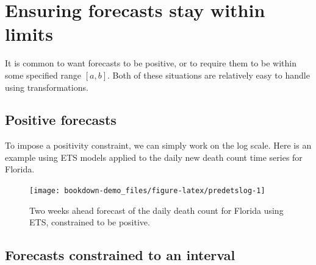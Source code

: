 \documentclass[]{book}
\newenvironment{Shaded}{\begin{snugshade}}{\end{snugshade}}
\newcommand{\KeywordTok}[1]{\textcolor[rgb]{0.13,0.29,0.53}{\textbf{#1}}}
\newcommand{\DataTypeTok}[1]{\textcolor[rgb]{0.13,0.29,0.53}{#1}}
\newcommand{\DecValTok}[1]{\textcolor[rgb]{0.00,0.00,0.81}{#1}}
\newcommand{\StringTok}[1]{\textcolor[rgb]{0.31,0.60,0.02}{#1}}
\newcommand{\OperatorTok}[1]{\textcolor[rgb]{0.81,0.36,0.00}{\textbf{#1}}}
\newcommand{\NormalTok}[1]{#1}
\begin{document}
\section{Ensuring forecasts stay within
limits}\label{ensuring-forecasts-stay-within-limits}

It is common to want forecasts to be positive, or to require them to be
within some specified range \([a,b]\). Both of these situations are
relatively easy to handle using transformations.

\subsection{Positive forecasts}\label{positive-forecasts}

To impose a positivity constraint, we can simply work on the log scale.
Here is an example using ETS models applied to the daily new death count
time series for Florida.

\begin{Shaded}
\end{Shaded}

\begin{figure}

{\centering \texttt{[image: bookdown-demo\_files/figure-latex/predetslog-1]} 

}

\caption{Two weeks ahead forecast of the daily death count for Florida using ETS, constrained to be positive.}\label{fig:predetslog}
\end{figure}

\subsection{Forecasts constrained to an
interval}\label{forecasts-constrained-to-an-interval}
\end{document}
